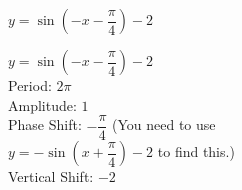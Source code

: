 {$y = \sin \left( -x - \dfrac{\pi}{4} \right) - 2$}
{$y = \sin \left( -x - \dfrac{\pi}{4} \right) - 2$ \\
Period: $2\pi$\\
Amplitude: $1$\\
Phase Shift: $-\dfrac{\pi}{4}$ (You need to use \\ \vspace*{.1in}
$y = -\sin \left( x + \dfrac{\pi}{4} \right) - 2 $ to find this.)\\
Vertical Shift: $-2$

\begin{center}
\end{center}
}
